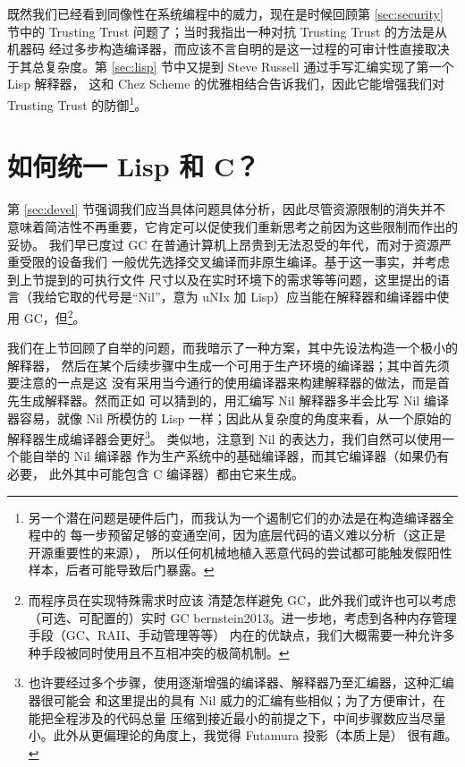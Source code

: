 既然我们已经看到同像性在系统编程中的威力，现在是时候回顾第 \ref{sec:security}
节中的 Trusting Trust 问题了；当时我指出一种对抗 Trusting Trust 的方法是从机器码
经过多步构造编译器，而应该不言自明的是这一过程的可审计性直接取决于其总复杂度。第
\ref{sec:lisp} 节中又提到 Steve Russell 通过手写汇编实现了第一个 Lisp 解释器，
这和 Chez Scheme 的优雅相结合告诉我们，因此它能增强我们对 Trusting Trust 的防御\footnote%
{另一个潜在问题是硬件后门，而我认为一个遏制它们的办法是在构造编译器全程中的
每一步预留足够的变通空间，因为底层代码的语义难以分析（这正是开源重要性的来源），
所以任何机械地植入恶意代码的尝试都可能触发假阳性样本，后者可能导致后门暴露。}。

\section{如何统一 Lisp 和 C？}\label{sec:howto}

第 \ref{sec:devel} 节强调我们应当具体问题具体分析，因此尽管资源限制的消失并不
意味着简洁性不再重要，它肯定可以促使我们重新思考之前因为这些限制而作出的妥协。
我们早已度过 GC 在普通计算机上昂贵到无法忍受的年代，而对于资源严重受限的设备我们
一般优先选择交叉编译而非原生编译。基于这一事实，并考虑到上节提到的可执行文件
尺寸以及在实时环境下的需求等等问题，这里提出的语言（我给它取的代号是“Nil”，意为
uNIx 加 Lisp）应当能在解释器和编译器中使用 GC，但\footnote{而程序员在实现特殊需求时应该
清楚怎样避免 GC，此外我们或许也可以考虑（可选、可配置的）实时 GC\cupercite%
{bernstein2013}。进一步地，考虑到各种内存管理手段（GC、RAII、手动管理等等）
内在的优缺点，我们大概需要一种允许多种手段被同时使用且不互相冲突的极简机制。}。

我们在上节回顾了自举的问题，而我暗示了一种方案，其中先设法构造一个极小的解释器，
然后在某个后续步骤中生成一个可用于生产环境的编译器；其中首先须要注意的一点是这
没有采用当今通行的使用编译器来构建解释器的做法，而是首先生成解释器。然而正如
可以猜到的，用汇编写 Nil 解释器多半会比写 Nil 编译器容易，就像 Nil 所模仿的
Lisp 一样；因此从复杂度的角度来看，从一个原始的解释器生成编译器会更好\footnote%
{也许要经过多个步骤，使用逐渐增强的编译器、解释器乃至汇编器，这种汇编器很可能会
和这里提出的具有 Nil 威力的汇编有些相似；为了方便审计，在能把全程涉及的代码总量
压缩到接近最小的前提之下，中间步骤数应当尽量小。此外从更偏理论的角度上，我觉得
Futamura 投影（本质上是） 很有趣。}。
类似地，注意到 Nil 的表达力，我们自然可以使用一个能自举的 Nil 编译器
作为生产系统中的基础编译器，而其它编译器（如果仍有必要，
此外其中可能包含 C 编译器）都由它来生成。

